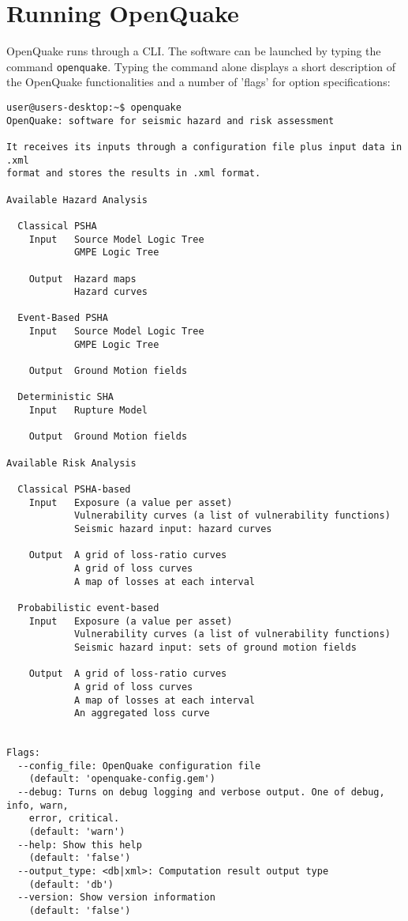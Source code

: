 \section{Running OpenQuake}
OpenQuake runs through a CLI. The software can be launched by typing the command \Verb+openquake+. Typing the command alone displays a short description of the OpenQuake functionalities and a number of 'flags' for option specifications:
\begin{Verbatim}[frame=single, commandchars=\\\{\}, fontsize=\scriptsize]
user@users-desktop:~$ openquake
OpenQuake: software for seismic hazard and risk assessment

It receives its inputs through a configuration file plus input data in .xml
format and stores the results in .xml format.

Available Hazard Analysis

  Classical PSHA
    Input   Source Model Logic Tree
            GMPE Logic Tree

    Output  Hazard maps
            Hazard curves

  Event-Based PSHA
    Input   Source Model Logic Tree
            GMPE Logic Tree

    Output  Ground Motion fields

  Deterministic SHA
    Input   Rupture Model

    Output  Ground Motion fields

Available Risk Analysis

  Classical PSHA-based
    Input   Exposure (a value per asset)
            Vulnerability curves (a list of vulnerability functions)
            Seismic hazard input: hazard curves

    Output  A grid of loss-ratio curves
            A grid of loss curves
            A map of losses at each interval

  Probabilistic event-based
    Input   Exposure (a value per asset)
            Vulnerability curves (a list of vulnerability functions)
            Seismic hazard input: sets of ground motion fields

    Output  A grid of loss-ratio curves
            A grid of loss curves
            A map of losses at each interval
            An aggregated loss curve


Flags:
  --config_file: OpenQuake configuration file
    (default: 'openquake-config.gem')
  --debug: Turns on debug logging and verbose output. One of debug, info, warn,
    error, critical.
    (default: 'warn')
  --help: Show this help
    (default: 'false')
  --output_type: <db|xml>: Computation result output type
    (default: 'db')
  --version: Show version information
    (default: 'false')
\end{Verbatim}
